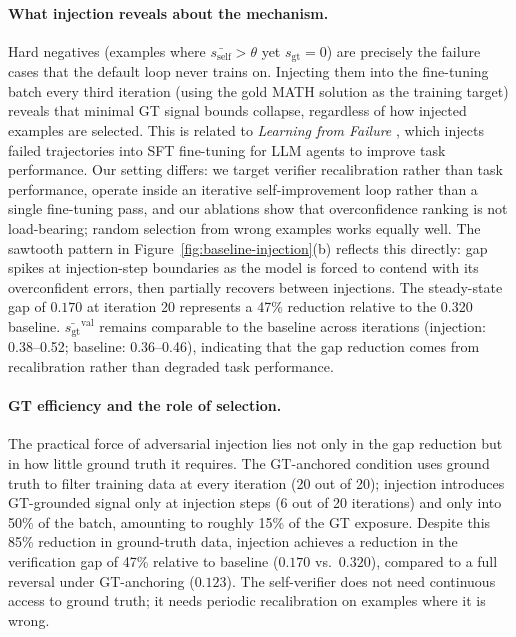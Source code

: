 \documentclass{article}
\newcommand{\self}{s_{\text{self}}}     %
\newcommand{\gt}{s_{\text{gt}}}         %
\begin{document}
\paragraph{What injection reveals about the mechanism.}
Hard negatives (examples where $\bar{\self} > \theta$ yet $\gt = 0$) are
precisely the failure cases that the default loop never trains on.
Injecting them into the fine-tuning batch every third iteration (using the
gold MATH solution as the training target) reveals that minimal GT signal
bounds collapse, regardless of how injected examples are selected.
This is related to \emph{Learning from Failure} \citep{wang2024learningfromfailure},
which injects failed trajectories into SFT fine-tuning for LLM agents to improve task
performance.
Our setting differs: we target verifier recalibration rather than task
performance, operate inside an iterative self-improvement loop rather than a
single fine-tuning pass, and our ablations show that overconfidence ranking
is not load-bearing; random selection from wrong examples works equally well.
The sawtooth pattern in Figure~\ref{fig:baseline-injection}(b) reflects this directly: gap
spikes at injection-step boundaries as the model is forced to contend with
its overconfident errors, then partially recovers between injections.
The steady-state gap of $0.170$ at iteration 20 represents a 47\% reduction
relative to the 0.320 baseline. $\bar{\gt}^\text{val}$ remains comparable
to the baseline across iterations (injection: 0.38--0.52; baseline: 0.36--0.46),
indicating that the gap reduction comes from recalibration rather than
degraded task performance.

\paragraph{GT efficiency and the role of selection.}
The practical force of adversarial injection lies not only in the gap reduction
but in how little ground truth it requires.
The GT-anchored condition uses ground truth to filter training data at every
iteration (20 out of 20); injection introduces GT-grounded signal only at
injection steps (6 out of 20 iterations) and only into 50\% of the batch,
amounting to roughly 15\% of the GT exposure.
Despite this 85\% reduction in ground-truth data, injection achieves a reduction
in the verification gap of 47\% relative to baseline ($0.170$ vs.\ $0.320$),
compared to a full reversal under GT-anchoring ($0.123$).
The self-verifier does not need continuous access to ground truth; it needs
periodic recalibration on examples where it is wrong.
\end{document}
